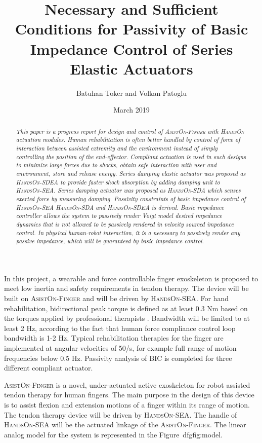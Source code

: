\documentclass{article}
\begin{document}
\title{Necessary and Sufficient Conditions for Passivity of Basic Impedance Control of Series Elastic Actuators}
\author{Batuhan Toker and Volkan Patoglu }
\date{March 2019}
\maketitle
\begin{abstract}
\emph{This paper is a progress report for design and control of \textsc{AsistOn-Finger} with  \textsc{HandsOn} actuation modules. Human rehabilitation is often better handled by control of force of interaction between assisted extremity and the environment instead of simply controlling the position of the end-effector. Compliant actuation is used in such designs to minimize large forces due to shocks, obtain safe interaction with user and environment, store and release energy. Series damping elastic actuator was proposed as  \textsc{HandsOn-SDEA} to provide faster shock absorption by adding damping unit to \textsc{HandsOn-SEA}. Series damping actuator was proposed as \textsc{HandsOn-SDA} which senses exerted force by measuring damping. Passivity constraints of basic impedance control of \textsc{HandsOn-SEA} \textsc{HandsOn-SDA} and \textsc{HandsOn-SDEA} is derived. Basic impedance controller allows the system to passively render Voigt model desired impedance dynamics that is not allowed to be passively rendered in velocity sourced impedance control. In physical human-robot interaction, it is a necessary to passively render any passive impedance, which will be guaranteed by basic impedance control.}
\end{abstract}
In this project, a wearable and force controllable finger exoskeleton is proposed to meet low inertia and safety requirements in tendon therapy. The device will be built on \textsc{AsistOn-Finger}\cite{ertas}  and will be driven by \textsc{HandsOn-SEA}\cite{handsonsea}. For hand rehabilitation, bidirectional peak torque is defined as at least 0.3 Nm based on the torques applied by professional therapists \cite{Ueki2012DevelopmentOA}. Bandwidth will be limited to at least 2 Hz, according to the fact that human force compliance control loop bandwidth is 1-2 Hz\cite{chan}\cite{sheridan}. Typical rehabilitation therapies for the finger are implemented at angular velocities of 50\degree/s, for example full range of motion frequencies below 0.5 Hz\cite{Adamovich}\cite{kawasaki}. 
Passivity analysis of BIC is completed for three different compliant actuator.  


\textsc{AsistOn-Finger} is a novel, under-actuated active exoskeleton for robot assisted tendon therapy for human fingers. The main purpose in the design of this device is to assist flexion and extension motions of a finger within its range of motion. The tendon therapy device will be driven by \textsc{HandsOn-SEA}. The handle of \textsc{HandsOn-SEA} will be the actuated linkage of the \textsc{AsistOn-Finger}. The linear analog model for the system is represented in the Figure~dfgfig:model.
\end{document}

